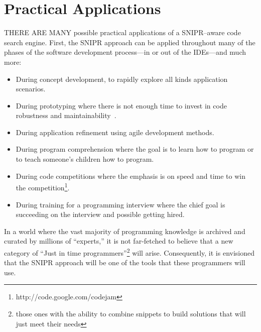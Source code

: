 \chapter{Practical Applications}{}
\label{sec:applications}

\lettrine[lraise=0.1, nindent=0em, slope=-.5em]{T} {HERE ARE MANY} possible practical applications of a \uppercase{SnipR}--aware code search engine. First, the \uppercase{SnipR} approach can be applied throughout many of the phases of the software development process---in or out of the IDEs---and much more:

\begin{itemize}
\item During concept development, to rapidly explore all kinds application 
    scenarios.
\item During prototyping where there is not enough time to invest in 
    code robustness and maintainability~\cite{Brandt:2008wi, Ncube:2008fm, Brandt:2009jb}. 
\item During application refinement using agile development methods. 
\item During program comprehension where the goal is to learn how to program or 
    to teach someone's children how to program.  
\item During code competitions where the emphasis is on speed and time to win 
    the competition\footnote{http://code.google.com/codejam}.
\item During training for a programming interview where the chief goal is succeeding on the 
    interview and possible getting hired.
\end{itemize}

In a world where the vast majority of programming knowledge is archived and curated by millions of ``experts,'' it is not far-fetched to believe that a new category of ``Just in time programmers''\footnote{those ones with the ability to combine snippets to build solutions that will just meet their needs} will arise. Consequently, it is envisioned that the \uppercase{SnipR} approach will be one of the tools that these programmers will use.